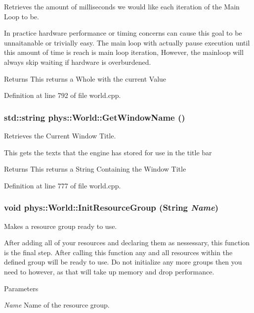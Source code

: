 Retrieves the amount of milliseconds we would like each iteration of the Main Loop to be. 

In practice hardware performance or timing concerns can cause this goal to be unnaitanable or trivially easy. The main loop with actually pause execution until this amount of time is reach is main loop iteration, However, the mainloop will always skip waiting if hardware is overburdened. \begin{DoxyReturn}{Returns}
This returns a Whole with the current Value 
\end{DoxyReturn}


Definition at line 792 of file world.cpp.

\hypertarget{classphys_1_1World_a1f0139bbc9561bcf18844be25e4adc73}{
\subsubsection[{GetWindowName}]{\setlength{\rightskip}{0pt plus 5cm}std::string phys::World::GetWindowName ()}}
\label{da/ddf/classphys_1_1World_a1f0139bbc9561bcf18844be25e4adc73}


Retrieves the Current Window Title. 

This gets the texts that the engine has stored for use in the title bar \begin{DoxyReturn}{Returns}
This returns a String Containing the Window Title 
\end{DoxyReturn}


Definition at line 777 of file world.cpp.

\hypertarget{classphys_1_1World_a82b1b40f39c1f2e48759fdb77389153d}{
\subsubsection[{InitResourceGroup}]{\setlength{\rightskip}{0pt plus 5cm}void phys::World::InitResourceGroup ({\bf String} {\em Name})}}
\label{da/ddf/classphys_1_1World_a82b1b40f39c1f2e48759fdb77389153d}


Makes a resource group ready to use. 

After adding all of your resources and declaring them as nessessary, this function is the final step. After calling this function any and all resources within the defined group will be ready to use. Do not initialize any more groups then you need to however, as that will take up memory and drop performance. 
\begin{DoxyParams}{Parameters}
\item[{\em Name}]Name of the resource group. \end{DoxyParams}


